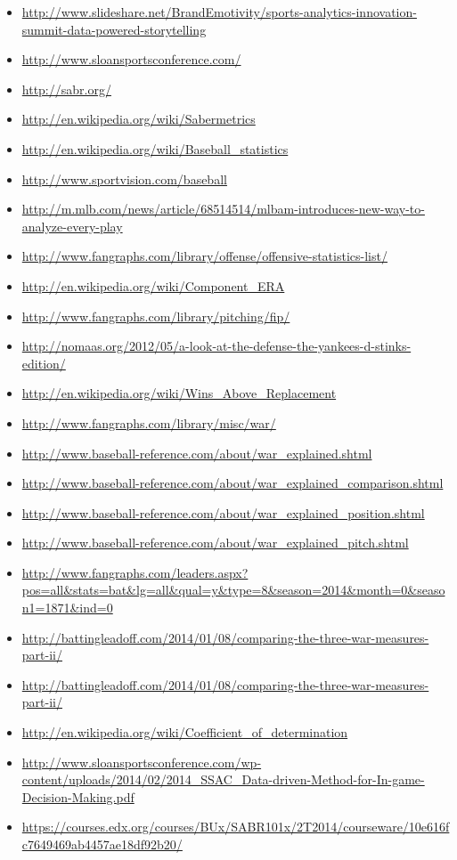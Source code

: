\begin{itemize}
\item
  \url{http://www.slideshare.net/BrandEmotivity/sports-analytics-innovation-summit-data-powered-storytelling}
\item
  \url{http://www.sloansportsconference.com/}
\item
  \url{http://sabr.org/}
\item
  \url{http://en.wikipedia.org/wiki/Sabermetrics}
\item
  \url{http://en.wikipedia.org/wiki/Baseball_statistics}
\item
  \url{http://www.sportvision.com/baseball}
\item
  \url{http://m.mlb.com/news/article/68514514/mlbam-introduces-new-way-to-analyze-every-play}
\item
  \url{http://www.fangraphs.com/library/offense/offensive-statistics-list/}
\item
  \url{http://en.wikipedia.org/wiki/Component_ERA}
\item
  \url{http://www.fangraphs.com/library/pitching/fip/}
\item
  \url{http://nomaas.org/2012/05/a-look-at-the-defense-the-yankees-d-stinks-edition/}
\item
  \url{http://en.wikipedia.org/wiki/Wins_Above_Replacement}
\item
  \url{http://www.fangraphs.com/library/misc/war/}
\item
  \url{http://www.baseball-reference.com/about/war_explained.shtml}
\item
  \url{http://www.baseball-reference.com/about/war_explained_comparison.shtml}
\item
  \url{http://www.baseball-reference.com/about/war_explained_position.shtml}
\item
  \url{http://www.baseball-reference.com/about/war_explained_pitch.shtml}
\item
  \url{http://www.fangraphs.com/leaders.aspx?pos=all\&stats=bat\&lg=all\&qual=y\&type=8\&season=2014\&month=0\&season1=1871\&ind=0}
\item
  \url{http://battingleadoff.com/2014/01/08/comparing-the-three-war-measures-part-ii/}
\item
  \url{http://battingleadoff.com/2014/01/08/comparing-the-three-war-measures-part-ii/}
\item
  \url{http://en.wikipedia.org/wiki/Coefficient_of_determination}
\item
  \url{http://www.sloansportsconference.com/wp-content/uploads/2014/02/2014_SSAC_Data-driven-Method-for-In-game-Decision-Making.pdf}
\item
  \url{https://courses.edx.org/courses/BUx/SABR101x/2T2014/courseware/10e616fc7649469ab4457ae18df92b20/}
\end{itemize}

